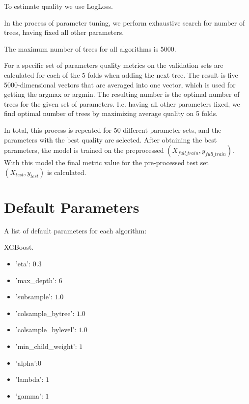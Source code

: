 \documentclass{article}
\begin{document}
To estimate quality we use LogLoss.
 

In the process of parameter tuning, we perform exhaustive search for number of trees, having fixed all other parameters.

The maximum number of trees for all algorithms is 5000.

For a specific set of parameters quality metrics on the validation sets are calculated for each of the 5 folds when adding the next tree. The result is five 5000-dimensional vectors that are averaged into one vector, which is used for getting the argmax or argmin. The resulting number is the optimal number of trees for the given set of parameters. I.e. having all other parameters fixed, we find optimal number of trees by maximizing average quality on 5 folds.

In total, this process is repeated for 50 different parameter sets, and the parameters with the best quality are selected. After obtaining the best parameters, the model is trained on the preprocessed $(X_{full\_train}, y_{full\_train})$. With this model the final metric value for the pre-processed test set $(X_{test}, y_{test})$ is calculated.

\section{Default Parameters}
A list of default parameters for each algorithm:

\medskip
\noindent XGBoost.
\begin{itemize}
  \item 'eta': $0.3$
  \item 'max\_depth': $6$
  \item 'subsample': $1.0$
  \item 'colsample\_bytree': $1.0$
  \item 'colsample\_bylevel': $1.0$
  \item 'min\_child\_weight': $1$
  \item 'alpha':$0$
  \item 'lambda': $1$
  \item 'gamma': $1$
\end{itemize}
\end{document}
